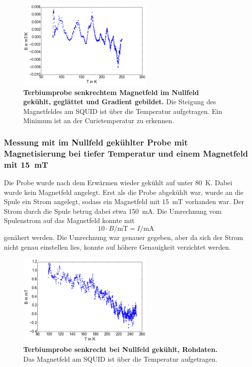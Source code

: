 \documentclass[a4paper,ngerman]{scrartcl}
\begin{document}
\begin{figure}
\centering
\includegraphics[width=0.6\textwidth]{abbildungen/Tb_sr_0_grad.png}
\caption[Terbiumprobe senkrecht bei Nullfeld]{\textbf{Terbiumprobe
    senkrechtem Magnetfeld im Nullfeld gekühlt, geglättet und Gradient gebildet.} 
    Die Steigung des Magnetfeldes am SQUID ist über die Temperatur aufgetragen. Ein Minimum ist an der Curietemperatur zu erkennen.}
\label{fig:Tb_sr_0_grad}
\end{figure}

\subsubsection*{Messung mit im Nullfeld gekühlter Probe mit Magnetisierung bei tiefer Temperatur und einem Magnetfeld mit \SI{15}{mT}}

Die Probe wurde nach dem Erwärmen wieder gekühlt auf unter \SI{80}{K}.
Dabei wurde kein Magnetfeld angelegt.
Erst als die Probe abgekühlt war, wurde an die Spule ein Strom angelegt, sodass ein Magnetfeld mit \SI{15}{mT} vorhanden war.
Der Strom durch die Spule betrug dabei etwa \SI{150}{\mA}.
Die Umrechnung vom Spulenstrom auf das Magnetfeld konnte mit 
\begin{equation}
10 \cdot B/\mathrm{mT} = I /\mathrm{mA}
\end{equation} 
genähert werden. 
Die Umrechnung war genauer gegeben, aber da sich der Strom nicht genau einstellen lies, konnte auf höhere Genauigkeit verzichtet werden.


\begin{figure}
\centering
\includegraphics[width=0.6\textwidth]{abbildungen/Tb_sr_0_mit.png}
\caption[Terbiumprobe senkrecht bei Nullfeld]{\textbf{Terbiumprobe senkrecht bei Nullfeld gekühlt, Rohdaten.} Das Magnetfeld am SQUID ist über die Temperatur aufgetragen.}
\label{fig:Tb_sr_0_mit}
\end{figure}
\end{document}
